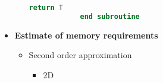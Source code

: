 \documentclass[12 pt, final]{article}
\begin{document}
\begin{itemize}
\begin{enumerate}
\begin{lstlisting}[language=fortran,mathescape=true]
            return T
            end subroutine
            \end{lstlisting}
        \end{enumerate}
    \item \textbf{Estimate of memory requirements}
    \begin{itemize}
        \item Second order approximation
        \begin{itemize}
            \begin{table}[H] %
            \\
            \end{table}   
            \item 2D


\end{itemize}
\end{itemize}
\end{itemize}
\end{document}

